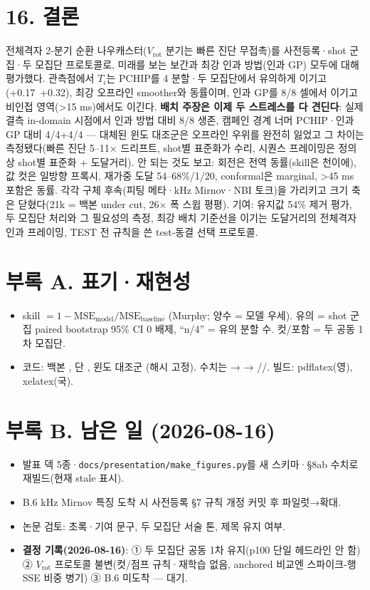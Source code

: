 \documentclass[10pt,a4paper]{article}
\newcommand{\Ti}{\ensuremath{T_i}}
\newcommand{\Vrot}{\ensuremath{V_\mathrm{rot}}}
\begin{document}
\section*{16. 결론}
전체격자 2-분기 순환 나우캐스터(\Vrot{} 분기는 빠른 진단 무접촉)를 사전등록·shot 군집·두 모집단 프로토콜로, 미래를 보는 보간과 최강 인과 방법(인과 GP) 모두에 대해 평가했다. 관측점에서 \Ti{}는 PCHIP를 4 분할·두 모집단에서 유의하게 이기고(+0.17~+0.32), 최강 오프라인 smoother와 동률이며, 인과 GP를 8/8 셀에서 이기고 비인접 영역(>15 ms)에서도 이긴다. \textbf{배치 주장은 이제 두 스트레스를 다 견딘다}: 실제 결측 in-domain 시점에서 인과 방법 대비 8/8 생존, 캠페인 경계 너머 PCHIP·인과 GP 대비 4/4+4/4 — 대체된 윈도 대조군은 오프라인 우위를 완전히 잃었고 그 차이는 측정됐다(빠른 진단 5–11$\times$ 드리프트, shot별 표준화가 수리, 시퀀스 프레이밍은 정의상 shot별 표준화 + 도달거리). 안 되는 것도 보고: 회전은 전역 동률(skill은 천이에), 값 컷은 일방향 프록시, 재가중 도달 54–68\%/1/20, conformal은 marginal, >45 ms 포함은 동률. 각각 구체 후속(피팅 메타·kHz Mirnov·NBI 토크)을 가리키고 크기 축은 닫혔다(21k = 백본 under cut, 26$\times$ 폭 스윕 평평). 기여: 유지값 54\% 제거 평가, 두 모집단 처리와 그 필요성의 측정, 최강 배치 기준선을 이기는 도달거리의 전체격자 인과 프레이밍, TEST 전 규칙을 쓴 test-동결 선택 프로토콜.

\section*{부록 A. 표기·재현성}
\begin{itemize}
\item skill $= 1 - \mathrm{MSE}_\text{model}/\mathrm{MSE}_\text{baseline}$ (Murphy; 양수 = 모델 우세). 유의 = shot 군집 paired bootstrap 95\% CI 0 배제, ``n/4'' = 유의 분할 수. 컷/포함 = 두 공동 1차 모집단.
\item 코드: 백본 , 단 , 윈도 대조군 (해시 고정). 수치는  →  → //. 빌드: pdflatex(영), xelatex(국).
\end{itemize}

\section*{부록 B. 남은 일 (2026-08-16)}
\begin{itemize}
\item[$\square$] 발표 덱 5종·\texttt{docs/presentation/make\_figures.py}를 새 스키마·\S8ab 수치로 재빌드(현재 stale 표시).
\item[$\square$] B.6 kHz Mirnov 특징 도착 시 사전등록 \S7 규칙 개정 커밋 후 파일럿→확대.
\item[$\square$] 논문 검토: 초록·기여 문구, 두 모집단 서술 톤, 제목 유지 여부.
\item \textbf{결정 기록(2026-08-16)}: ① 두 모집단 공동 1차 유지(p100 단일 헤드라인 안 함) ② \Vrot{} 프로토콜 불변(컷/점프 규칙·재학습 없음, anchored 비교엔 스파이크-행 SSE 비중 병기) ③ B.6 미도착 — 대기.
\end{itemize}
\end{document}
